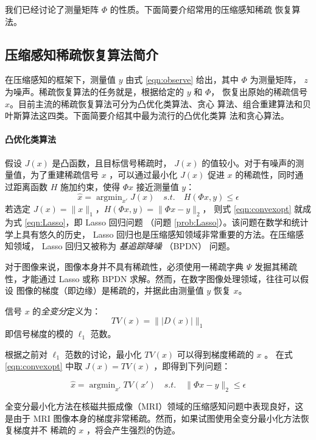 我们已经讨论了测量矩阵 $\Phi$ 的性质。下面简要介绍常用的压缩感知稀疏
恢复算法。

\subsection{压缩感知稀疏恢复算法简介}

在压缩感知的框架下，测量值 $y$ 由式 \ref{eqn:observe} 给出，其中 $\Phi$
为测量矩阵， $z$ 为噪声。稀疏恢复算法的任务就是，根据给定的 $y$ 和 $\Phi$，
恢复出原始的稀疏信号 $x$。目前主流的稀疏恢复算法可分为凸优化类算法、贪心
算法、组合重建算法和贝叶斯算法这四类。下面简要介绍其中最为流行的凸优化类算
法和贪心算法。

\paragraph{凸优化类算法} 假设 $J(x)$ 是凸函数，且目标信号稀疏时， $J(x)$
的值较小。对于有噪声的测量值，为了重建稀疏信号 $x$ ，可以通过最小化 $J(x)$
促进 $x$ 的稀疏性，同时通过距离函数 $H$ 施加约束，使得 $\Phi x$ 接近测量值
$y$：
\begin{equation} \label{eqn:convexopt}
\hat x = \mathop{\arg \min}_{x'} J(x) \quad s.t. \quad H(\Phi x, y) \leq
\epsilon
\end{equation}
若选定 $J(x) = \|x\|_1$，$H(\Phi x, y) = \|\Phi x - y\|_2$，
则式 \ref{eqn:convexopt} 就成为式 \ref{eqn:Lasso}，即 Lasso 回归问题
（问题 \ref{prob:Lasso}）。该问题在数学和统计学上具有悠久的历史， Lasso
回归也是压缩感知领域非常重要的方法。在压缩感知领域， Lasso 回归又被称为
\emph{基追踪降噪} （BPDN） 问题。

对于图像来说，图像本身并不具有稀疏性，必须使用一稀疏字典 $\Psi$ 发掘其稀疏
性，才能通过 Lasso 或称 BPDN 求解。然而，在数字图像处理领域，往往可以假设
图像的梯度（即边缘）是稀疏的，并据此由测量值 $y$ 恢复 $x$。
\begin{definition} [全变分]
信号 $x$ 的\emph{全变分}定义为：
\begin{equation}
TV(x) = \| |D(x)| \|_1
\end{equation}
即信号梯度的模的 $\ell_1$ 范数。
\end{definition}

根据之前对 $\ell_1$ 范数的讨论，最小化 $TV(x)$ 可以得到梯度稀疏的 $x$ 。
在式 \ref{eqn:convexopt} 中取 $J(x) = TV(x)$ ，即得到下列问题：
\begin{problem} \label{prob:TVopt}
\begin{equation}
\hat x = \mathop{\arg \min}_{x'} TV(x') \quad s.t. \quad 
\|\Phi x - y\|_2 \leq \epsilon
\end{equation}
\end{problem}
全变分最小化方法在核磁共振成像（MRI）领域的压缩感知问题中表现良好，这是由于
MRI 图像本身的梯度非常稀疏。然而，如果试图使用全变分最小化方法恢复梯度并不
稀疏的 $x$ ，将会产生强烈的伪迹。

